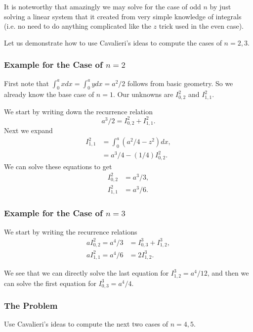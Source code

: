 It is noteworthy that amazingly we may solve for the case of odd \(n\) by just solving a linear system that
it created from very simple knowledge of integrals (i.e. no need to do anything complicated like the \(z\) trick
used in the even case).

Let us demonstrate how to use Cavalieri's ideas to compute the cases of \(n = 2, 3\). 

\subsubsection*{Example for the Case of \(n = 2\)}

First note that \(\int_0^a x dx  = \int_0^a y dx = a^2 / 2\) follows from basic geometry. So we already know the
base case of \(n = 1\). Our unknowns are \(I^2_{0, 2}\) and \(I^2_{1, 1}\). 

We start by writing down the recurrence relation
\begin{equation}
a^3/2 = I^2_{0, 2} + I^2_{1, 1}. 
\end{equation}
Next we expand
\begin{align}
I^2_{1, 1} & = \int_0^a (a^2 /4 - z^2) dx, \\
    & = a^3/4 - (1/4) I^2_{0, 2}. 
\end{align}
We can solve these equations to get
\begin{align}
I^2_{0, 2} & = a^3 / 3, \\
I^2_{1, 1} & = a^3 / 6. 
\end{align}

\subsubsection*{Example for the Case of \(n = 3\)}

We start by writing the recurrence relations
\begin{align}
a I^2_{0, 2} = a^4/3 & = I^3_{0, 3} + I^3_{1, 2}, \\
a I^2_{1, 1} = a^4 / 6 & = 2 I^3_{1, 2}. 
\end{align}

We see that we can directly solve the last equation for \(I^3_{1, 2} = a^4 / 12\), and then we can
solve the first equation for \(I^3_{0, 3} = a^4 / 4\).

\subsubsection*{The Problem}
Use Cavalieri's ideas to compute the next two cases of \(n = 4, 5\).

